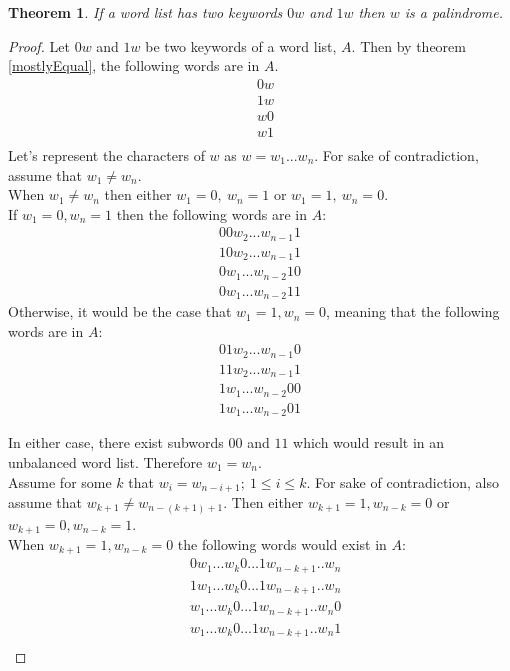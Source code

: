 \documentclass{article}
\newtheorem{theorem}{Theorem}[section]
\begin{document}
\begin{theorem}
    If a word list has two keywords $0w$ and $1w$ then $w$ is a palindrome.
\end{theorem}
\begin{proof}
    Let $0w$ and $1w$ be two keywords of a word list, $A$. Then by theorem \ref{mostlyEqual}, the following words are in $A$.
    \begin{align*}
        &0w \\
        &1w \\
        &w0 \\
        &w1 \\
    \end{align*}
    Let's represent the characters of $w$ as $w = w_1...w_n$. For sake of contradiction, assume that $w_1 \neq w_n$. \\
    When $w_1 \neq w_n$ then either $w_1 = 0,\ w_n = 1$ or $w_1 = 1,\ w_n = 0$.\\
    If $w_1 = 0, w_n = 1$ then the following words are in $A$:
    \begin{align*}
        00w_2...w_{n-1}1 \\
        10w_2...w_{n-1}1 \\
        0w_1...w_{n-2}10 \\
        0w_1...w_{n-2}11  
    \end{align*}
    Otherwise, it would be the case that $w_1 = 1, w_n = 0$, meaning that the following words are in $A$:
    \begin{align*}
        01w_2...w_{n-1}0 \\  
        11w_2...w_{n-1}1 \\ 
        1w_1...w_{n-2}00 \\
        1w_1...w_{n-2}01
    \end{align*}

    In either case, there exist subwords $00$ and $11$ which would result in an unbalanced word list. Therefore $w_1 = w_n$. \\

    Assume for some $k$ that $w_i = w_{n - i + 1};\ 1 \leq i \leq k$. For sake of contradiction, also assume that $w_{k + 1} \neq w_{n - (k + 1)  + 1}$. Then either $w_{k+1} = 1, w_{n - k} = 0$ or $w_{k+1} = 0, w_{n-k} = 1$. \\

    When $w_{k+1} = 1, w_{n - k} = 0$ the following words would exist in $A$:
    \begin{align*}
        &0w_1...w_k0...1w_{n-k + 1}..w_{n} \\
        &1w_1...w_k0...1w_{n-k + 1}..w_{n} \\
        &w_1...w_k0...1w_{n-k + 1}..w_{n}0 \\
        &w_1...w_k0...1w_{n-k + 1}..w_{n}1 \\
    \end{align*}


\end{proof}
\end{document}
